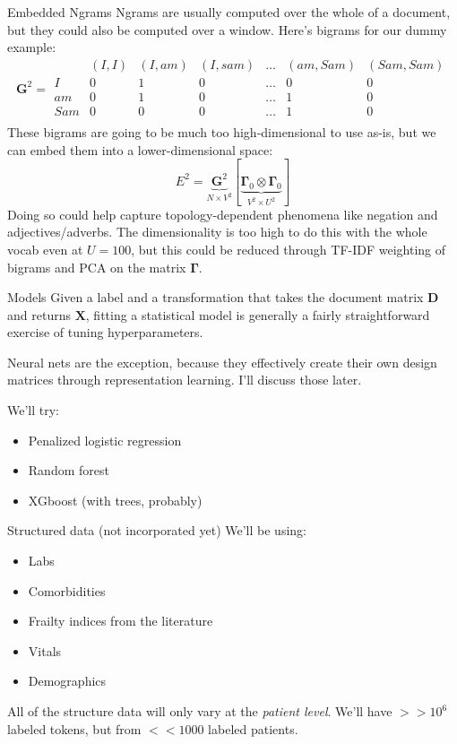 \documentclass[10pt]{beamer}
\begin{document}
\begin{frame}{Embedded Ngrams}
Ngrams are usually computed over the whole of a document, but they could also be computed over a window.  Here's bigrams for our dummy example:
\[\bm{G}^2 = {\displaystyle
\begin{array}{c|cccccc}
     & (I,I) & (I, am) & (I, sam) & \hdots & (am, Sam) & (Sam, Sam)\\
     \hline
I    & 0 & 1 & 0 & \hdots & 0 & 0\\
am   & 0 & 1 & 0 & \hdots & 1 & 0\\
Sam  & 0 & 0 & 0 & \hdots & 1 & 0\\
\end{array}}
\]
These bigrams are going to be much too high-dimensional to use as-is, but we can embed them into a lower-dimensional space:
\[
E^2 = \underbrace{\bm{G}^2}_{N\times V^2}\left[\underbrace{\bm{\Gamma}_0\otimes \bm{\Gamma}_0}_{V^2 \times U^2}\right]
\]
Doing so could help capture topology-dependent phenomena like negation and adjectives/adverbs.  The dimensionality is too high to do this with the whole vocab even at $U = 100$, but this could be reduced through TF-IDF weighting of bigrams and PCA on the matrix $\bm\Gamma$.
\end{frame}

\begin{frame}{Models}
Given a label and a transformation that takes the document matrix $\bm{D}$ and returns $\bm{X}$, fitting a statistical model is generally a fairly straightforward exercise of tuning hyperparameters.  

Neural nets are the exception, because they effectively create their own design matrices through representation learning.  I'll discuss those later.

We'll try:
\begin{itemize}
\item Penalized logistic regression
\item Random forest
\item XGboost (with trees, probably)
\end{itemize}
\end{frame}


\begin{frame}{Structured data (not incorporated yet)}
We'll be using:
\begin{itemize}
\item Labs
\item Comorbidities
\item Frailty indices from the literature
\item Vitals
\item Demographics
\end{itemize}
All of the structure data will only vary at the \textit{patient level}.  We'll have $>>10^6$ labeled tokens, but from $<<1000$ labeled patients. 
\end{frame}
\end{document}
